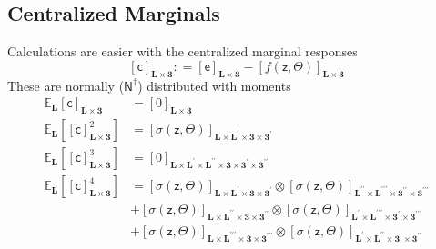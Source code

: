 \documentclass[preprint,12pt]{elsarticle}
\newcommand*{\M}[1]{\ensuremath{#1}\xspace}
\newcommand*{\x}{\times}
\newcommand*{\mi}[1]{\mathbf{#1}}
\newcommand*{\rv}[1]{\mathsf{#1}}
\newcommand*{\te}[2][]{\left\lbrack{#2}\right\rbrack_{#1}}
\newcommand*{\deq}{\M{\mathrel{\mathop:}=}}
\newcommand*{\ev}[3][]{\mathbb{E}_{#3}^{#1}\!\left\lbrack{#2}\right\rbrack}
\newcommand*{\evt}[3][]{\mathbb{E}_{#3}^{#1}\!#2}
\begin{document}
    \subsection{Centralized Marginals} \label{sub:ROM:CentralMarg}
        Calculations are easier with the centralized marginal responses
        \begin{equation*}
            \te[\mi{L\x 3}]{\rv{c}} \deq \te[\mi{L\x 3}]{\rv{e}} - \te[\mi{L\x 3}]{f(\rv{z},\Theta)}
        \end{equation*}
        These are normally ($\mathsf{N}^{\dagger}$) distributed with moments \cite{Isserlis1916,Isserlis1918}
        \begin{equation} \label{eq:ROM:CentralMarg:Moments}
            \begin{aligned}
                \evt{\te[\mi{L\x 3}]{\rv{c}}}{\mi{L}} &= \te[\mi{L\x 3}]{0} \\
                \ev{\te[\mi{L\x 3}]{\rv{c}}^{2}}{\mi{L}} &= \te[\mi{L\x L^{\prime}\x 3\x 3^{\prime}}]{\sigma(\rv{z},\Theta)} \\
                \ev{\te[\mi{L\x 3}]{\rv{c}}^{3}}{\mi{L}} &= \te[\mi{L\x L^{\prime}\x L^{\prime\prime}\x 3\x 3^{\prime}\x 3^{\prime\prime}}]{0} \\
                \ev{\te[\mi{L\x 3}]{\rv{c}}^{4}}{\mi{L}} &= 
                \te[\mi{L\x L^{\prime}\x 3\x 3^{\prime}}]{\sigma(\rv{z},\Theta)} \otimes
                \te[\mi{L^{\prime\prime}\x L^{\prime\prime\prime}\x 3^{\prime\prime}\x 3^{\prime\prime\prime}}]{\sigma(\rv{z},\Theta)} \\
                &+ \te[\mi{L\x L^{\prime\prime}\x 3\x 3^{\prime\prime}}]{\sigma(\rv{z},\Theta)} \otimes
                \te[\mi{L^{\prime}\x L^{\prime\prime\prime}\x 3^{\prime}\x 3^{\prime\prime\prime}}]{\sigma(\rv{z},\Theta)} \\
                &+ \te[\mi{L\x L^{\prime\prime\prime}\x 3\x 3^{\prime\prime\prime}}]{\sigma(\rv{z},\Theta)} \otimes
                \te[\mi{L^{\prime}\x L^{\prime\prime}\x 3^{\prime}\x 3^{\prime\prime}}]{\sigma(\rv{z},\Theta)}
            \end{aligned}
        \end{equation}
\end{document}
